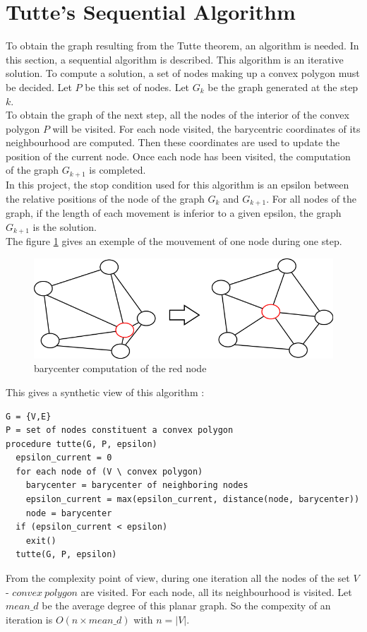\section{Tutte's Sequential Algorithm}

To obtain the graph resulting from the Tutte theorem, an algorithm is
needed. In this section, a sequential algorithm is described. This
algorithm is an iterative solution. To compute a solution, a set of nodes
 making up a convex polygon must be decided. Let $P$ be this set of nodes. Let
$G_k$ be the graph generated at the step $k$.
\\

To obtain the graph of the next step, all the nodes of the interior of the
convex polygon $P$ will be visited. For each node visited, the barycentric
coordinates of its neighbourhood are computed. Then these coordinates are used
to update the position of the current node. Once each node has been visited,
the computation of the graph $G_{k+1}$ is completed.
\\
In this project, the stop condition used for this algorithm is an epsilon
between the relative positions of the node of the graph $G_k$ and
$G_{k+1}$. For all nodes of the graph, if the length of each movement is
inferior to a given epsilon, the graph $G_{k+1}$ is the solution.
\\

The figure \ref{transition} gives an exemple of the mouvement of one node
during one step.
\begin{figure}[!h]
\centering
\includegraphics[scale=0.5]{img/transition.png}
\caption{barycenter computation of the red node}
\label{transition}
\end{figure}

This gives a synthetic view of this algorithm : 
\begin{verbatim}
G = {V,E}
P = set of nodes constituent a convex polygon
procedure tutte(G, P, epsilon)
  epsilon_current = 0
  for each node of (V \ convex polygon)
    barycenter = barycenter of neighboring nodes
    epsilon_current = max(epsilon_current, distance(node, barycenter))
    node = barycenter
  if (epsilon_current < epsilon)
    exit()
  tutte(G, P, epsilon)
\end{verbatim}

From the complexity point of view, during one iteration all the nodes of
the set $V$ - $convex~polygon$ are visited. For each node, all its
neighbourhood is visited. Let $mean\_d$ be the average degree of this planar
graph. So the compexity of an iteration is $\mathit{O(n \times mean\_d)}$
with $n = |V|$.

